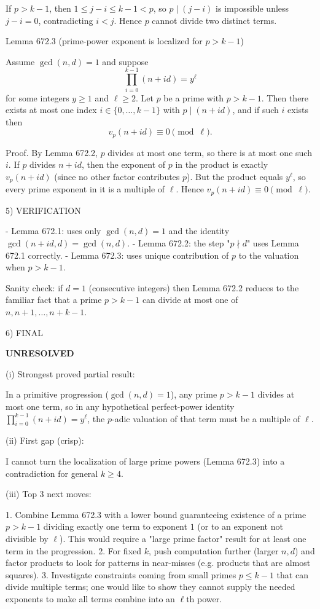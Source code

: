If $p>k-1$, then $1\le j-i\le k-1<p$, so $p\mid (j-i)$ is impossible unless $j-i=0$, contradicting $i<j$. Hence $p$ cannot divide two distinct terms.


Lemma 672.3 (prime-power exponent is localized for $p>k-1$)

Assume $\gcd(n,d)=1$ and suppose
\[
\prod_{i=0}^{k-1}(n+id)=y^{\ell}
\]
for some integers $y\ge 1$ and $\ell\ge 2$.
Let $p$ be a prime with $p>k-1$. Then there exists at most one index $i\in\{0,\dots,k-1\}$ with $p\mid(n+id)$, and if such $i$ exists then
\[
 v_p(n+id)\equiv 0\pmod{\ell}.
\]

Proof.
By Lemma 672.2, $p$ divides at most one term, so there is at most one such $i$.
If $p$ divides $n+id$, then the exponent of $p$ in the product is exactly $v_p(n+id)$ (since no other factor contributes $p$). But the product equals $y^{\ell}$, so every prime exponent in it is a multiple of $\ell$. Hence $v_p(n+id)\equiv 0\pmod{\ell}$.


5) VERIFICATION

- Lemma 672.1: uses only $\gcd(n,d)=1$ and the identity $\gcd(n+id,d)=\gcd(n,d)$.
- Lemma 672.2: the step "$p\nmid d$" uses Lemma 672.1 correctly.
- Lemma 672.3: uses unique contribution of $p$ to the valuation when $p>k-1$.

Sanity check: if $d=1$ (consecutive integers) then Lemma 672.2 reduces to the familiar fact that a prime $p>k-1$ can divide at most one of $n,n+1,\dots,n+k-1$.

6) FINAL

\textbf{UNRESOLVED}

(i) Strongest proved partial result:

In a primitive progression ($\gcd(n,d)=1$), any prime $p>k-1$ divides at most one term, so in any hypothetical perfect-power identity $\prod_{i=0}^{k-1}(n+id)=y^{\ell}$, the $p$-adic valuation of that term must be a multiple of $\ell$.

(ii) First gap (crisp):

I cannot turn the localization of large prime powers (Lemma 672.3) into a contradiction for general $k\ge 4$.

(iii) Top 3 next moves:

1. Combine Lemma 672.3 with a lower bound guaranteeing existence of a prime $p>k-1$ dividing exactly one term to exponent $1$ (or to an exponent not divisible by $\ell$). This would require a "large prime factor" result for at least one term in the progression.
2. For fixed $k$, push computation further (larger $n,d$) and factor products to look for patterns in near-misses (e.g. products that are almost squares).
3. Investigate constraints coming from small primes $p\le k-1$ that can divide multiple terms; one would like to show they cannot supply the needed exponents to make all terms combine into an $\ell$th power.

